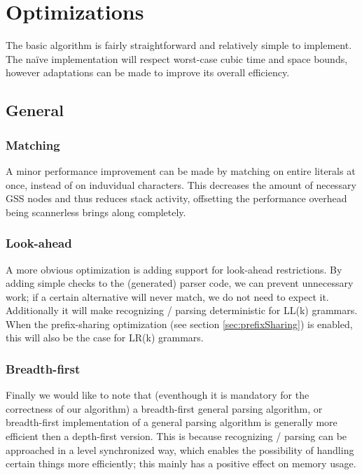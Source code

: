 \documentclass[a4paper,10pt]{article}
\begin{document}
\section{Optimizations}
\label{chap:optimizations}

The basic algorithm is fairly straightforward and relatively simple to implement. The naïve implementation will respect worst-case cubic time and space bounds, however adaptations can be made to improve its overall efficiency.

\subsection{General}

\subsubsection{Matching}
A minor performance improvement can be made by matching on entire literals at once, instead of on induvidual characters. This decreases the amount of necessary GSS nodes and thus reduces stack activity, offsetting the performance overhead being scannerless brings along completely.

\subsubsection{Look-ahead}
A more obvious optimization is adding support for look-ahead restrictions. By adding simple checks to the (generated) parser code, we can prevent unnecessary work; if a certain alternative will never match, we do not need to expect it. Additionally it will make recognizing / parsing deterministic for LL(k) grammars. When the prefix-sharing optimization (see section \ref{sec:prefixSharing}) is enabled, this will also be the case for LR(k) grammars.

\subsubsection{Breadth-first}
Finally we would like to note that (eventhough it is mandatory for the correctness of our algorithm) a breadth-first general parsing algorithm, or breadth-first implementation of a general parsing algorithm is generally more efficient then a depth-first version. This is because recognizing / parsing can be approached in a level synchronized way, which enables the possibility of handling certain things more efficiently; this mainly has a positive effect on memory usage.
\end{document}
